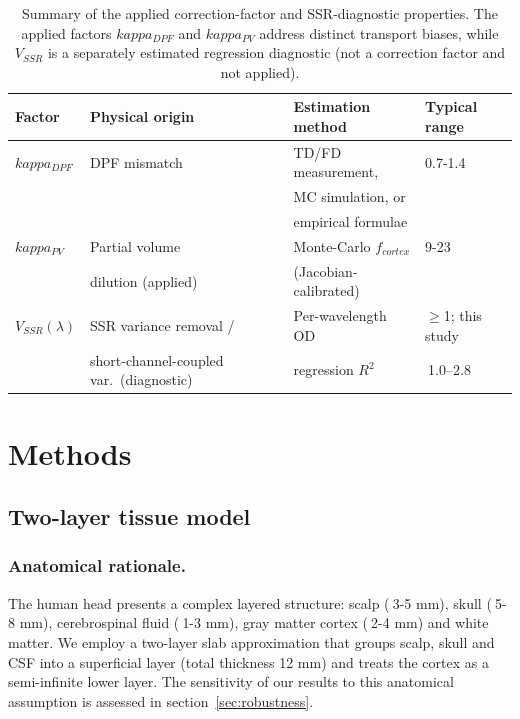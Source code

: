 \documentclass[11pt]{article}
\def\kappa{kappa}%
\def\sim{~}%
\def\mathrm#1{#1}%
\def\,{ }%
\begin{document}
\begin{table}[ht]
\centering
\caption{Summary of the applied correction-factor and SSR-diagnostic properties. The applied factors $\kappa_{\mathrm{DPF}}$ and $\kappa_{\mathrm{PV}}$ address distinct transport biases, while $V_{\mathrm{SSR}}$ is a separately estimated regression diagnostic (not a correction factor and not applied).}
\label{tab:kappa_properties}
\begin{tabular}{@{}llll@{}}
\toprule
\textbf{Factor} & \textbf{Physical origin} & \textbf{Estimation method} & \textbf{Typical range} \\
\midrule
$\kappa_{\mathrm{DPF}}$ & DPF mismatch & TD/FD measurement, & 0.7-1.4 \\
& & MC simulation, or & \\
& & empirical formulae & \\
$\kappa_{\mathrm{PV}}$ & Partial volume & Monte-Carlo $f_{\mathrm{cortex}}$ & 9-23 \\
& dilution (applied) & (Jacobian-calibrated) & \\
$V_{\mathrm{SSR}}(\lambda)$ & SSR variance removal / & Per-wavelength OD & $\geq$1; this study \\
& short-channel-coupled var.\ (diagnostic) & regression $R^2$ & $\sim$1.0--2.8 \\
\bottomrule
\end{tabular}
\end{table}

\section{Methods}

\subsection{Two-layer tissue model}

\subsubsection{Anatomical rationale.}
The human head presents a complex layered structure: scalp ($\sim$3-5\,mm), skull ($\sim$5-8\,mm), cerebrospinal fluid ($\sim$1-3\,mm), gray matter cortex ($\sim$2-4\,mm) and white matter\cite{r10,r12}. We employ a two-layer slab approximation that groups scalp, skull and CSF into a superficial layer (total thickness 12\,mm) and treats the cortex as a semi-infinite lower layer\cite{r10,r12}. The sensitivity of our results to this anatomical assumption is assessed in section~\ref{sec:robustness}.
\end{document}
